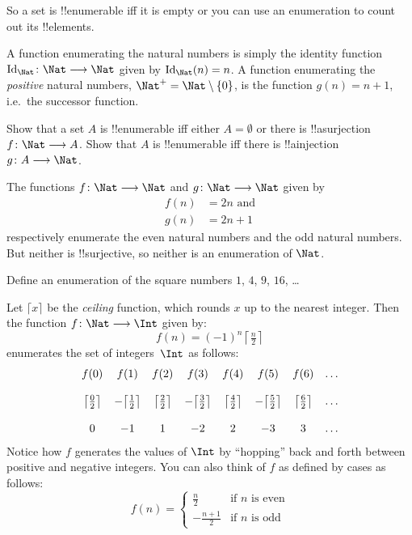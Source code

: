 \documentclass[../../../include/open-logic-section]{subfiles}
\begin{document}
\begin{explain}
So a set is !!{enumerable} iff it is empty or you can use an
enumeration to count out its !!{element}s.
\end{explain}

\begin{ex}
A function enumerating the natural numbers is simply the identity
function $\Id{\Nat} \colon \Nat \to \Nat$ given by $\Id{\Nat}(n) = n$. A
function enumerating the \emph{positive} natural numbers, $\Nat^+ =
\Nat \setminus \{0\}$, is the function $g(n) = n + 1$, i.e.\ the
successor function.
\end{ex}

\begin{prob}
Show that a set $A$ is !!{enumerable} iff either $A = \emptyset$ or
there is !!a{surjection} $f\colon \Nat \to A$. Show that $A$ is
!!{enumerable} iff there is !!a{injection} $g\colon A \to \Nat$. 
\end{prob}

\begin{ex}
The functions $f\colon \Nat \to \Nat$ and $g \colon \Nat \to \Nat$
given by
\begin{align*}
  f(n) & = 2n \text{ and}\\
  g(n) & = 2n+1
\end{align*}
respectively enumerate the even natural numbers and the odd natural
numbers. But neither is !!{surjective}, so neither is an enumeration
of $\Nat$.
\end{ex}

\begin{prob}
Define an enumeration of the square numbers $1$, $4$, $9$, $16$, \dots
\end{prob}

\begin{ex}
Let $\lceil x \rceil$ be the \emph{ceiling} function, which rounds $x$
up to the nearest integer. Then the function $f \colon \Nat \to \Int$
given by:
\[
  f(n) = (-1)^{n} \left\lceil\tfrac{n}{2}\right\rceil
\]
enumerates the set of
integers~$\Int$ as follows:
\[
\begin{array}{c c c c c c c c}
f(0) & f(1) & f(2) & f(3) & f(4) & f(5) & f(6) & \dots \\ \\
\big\lceil \tfrac{0}{2} \big\rceil & -\big\lceil \tfrac{1}{2}\big\rceil &  \big\lceil \tfrac{2}{2} \big\rceil & -\big\lceil \tfrac{3}{2} \big\rceil & \big\lceil \tfrac{4}{2} \big\rceil  & -\big\lceil \tfrac{5}{2}\big\rceil & \big\lceil \tfrac{6}{2} \big\rceil & \dots \\ \\
0 & -1 & 1 & -2 & 2 & -3 & 3& \dots
\end{array}
\]
Notice how $f$ generates the values of $\Int$ by ``hopping'' back and
forth between positive and negative integers. You can also think of
$f$ as defined by cases as follows:
\[
f(n) = \begin{cases}
  \frac{n}{2} & \text{if $n$ is even}\\
  -\frac{n+1}{2} & \text{if $n$ is odd}
  \end{cases}
\]
\end{ex}
\end{document}
